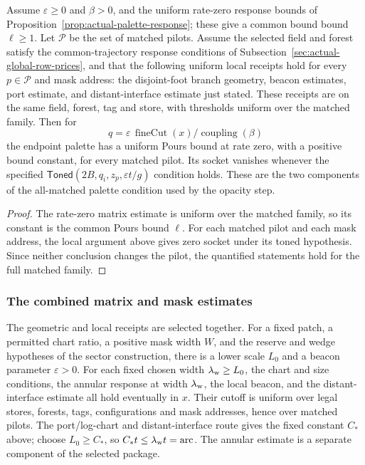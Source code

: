 \begin{proposition}
\label{prop:actual-palette-condition}
Assume $\varepsilon\geq0$ and $\beta>0$, and the uniform rate-zero response bounds of
Proposition~\ref{prop:actual-palette-response}; these give a common bound
bound $\ell\geq1$. Let $\mathcal P$ be the set of matched pilots. Assume
the selected field and forest satisfy the common-trajectory response conditions
of Subsection~\ref{sec:actual-global-row-prices}, and that the following
uniform local receipts hold for every $p\in\mathcal P$ and mask address:
the disjoint-foot branch geometry, beacon estimates, port estimate, and
distant-interface estimate just stated. These receipts are on the same field,
forest, tag and store, with thresholds uniform over the matched family.
Then for
\[
 q=\varepsilon\,\operatorname{fineCut}(x)/
                   \operatorname{coupling}(\beta)
\]
the endpoint palette has a uniform Pours bound at rate zero, with a positive
bound constant, for every matched pilot. Its socket vanishes whenever the
specified $\mathsf{Toned}(2B,q_i,z_p,\varepsilon t/g)$ condition holds.
These are the two components of the all-matched palette condition used by the opacity step.
\end{proposition}
\begin{proof}
The rate-zero matrix estimate is uniform over the matched family, so its
constant is the common Pours bound $\ell$. For each matched pilot and each
mask address, the local argument above gives zero socket
under its toned hypothesis. Since neither conclusion changes the pilot,
the quantified statements hold for the full matched family.
\end{proof}

\subsubsection{The combined matrix and mask estimates}

The geometric and local receipts are selected together. For a fixed
patch, a permitted chart ratio, a positive mask width $W$, and the reserve
and wedge hypotheses of the sector construction, there is a lower scale
$L_0$ and a beacon parameter $\varepsilon>0$. For each fixed chosen
width $\lambda_{\rm w}\geq L_0$, the chart and size conditions, the annular
response at width $\lambda_{\rm w}$, the local beacon, and the distant-interface
estimate all hold eventually in $x$. Their cutoff is uniform over legal
stores, forests, tags, configurations and mask addresses, hence over
matched pilots. The port/log-chart and distant-interface route gives the fixed
constant $C_*$ above; choose $L_0\geq C_*$, so
$C_*t\leq\lambda_{\rm w} t=\operatorname{arc}$. The annular estimate is a
separate component of the selected package.


